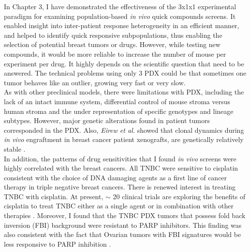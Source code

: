 In Chapter 3, I have demonstrated the effectiveness of the 3x1x1 experimental paradigm for examining population-based \textit{in vivo} quick compounds screens. It enabled insight into inter-patient response heterogeneity in an efficient manner, and helped to identify quick responsive subpopulations, thus enabling the selection of potential breast tumors or drugs. However, while testing new compounds, it would be more reliable to increase the number of mouse per experiment per drug. It highly depends on the scientific question that need to be answered. 
The technical problems using only 3 PDX could be that sometimes one tumor behaves like an outlier, growing very fast or very slow. 
\\
As with other preclinical models, there were limitations with PDX,
including the lack of an intact immune system, differential control
of mouse stroma versus human stroma and the under representation of specific genotypes and lineage subtypes. However, major genetic alterations found in patient tumors corresponded in the PDX. Also, \textit{Eirew et al.} showed that clonal dynamics during \textit{in vivo} engraftment in breast cancer patient xenografts, are genetically relatively stable \cite{eirew2015dynamics}.
\\
In addition, the patterns of drug sensitivities that I found \textit{in vivo} screens were highly correlated with the breast cancers. All TNBC were sensitive to cisplatin consistent with the choice of DNA damaging agents as a first line of cancer therapy in triple negative breast cancers. There is renewed interest in treating TNBC with cisplatin. At present, $\sim$ 20 clinical trials are exploring the benefits of cisplatin to treat TNBC either as a single agent or in combination with other therapies \cite{hill2019cisplatin}. Moreover, I found that the TNBC PDX tumors that possess fold back inversion (FBI) background were resistant to PARP inhibitors. This finding was also consistent with the fact that Ovarian tumors with FBI signatures would be less responsive to PARP inhibition \cite{wang2017genomic}.
   
